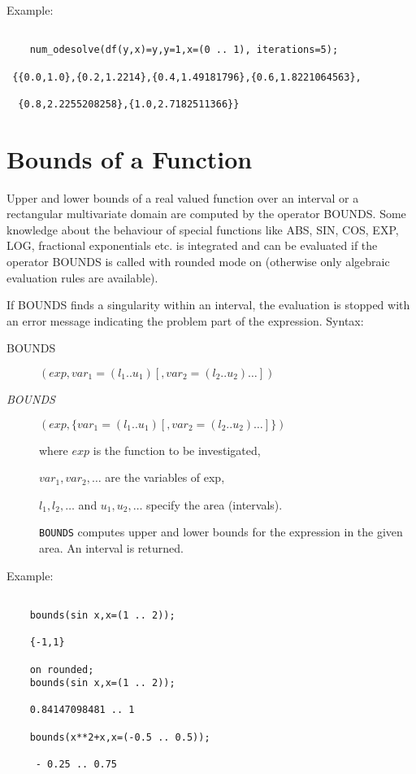 \documentclass[11pt,letterpaper]{book}
\makeatletter
\newcommand{\underscore}{\_}
\newcommand{\ttindex}[1]{{\renewcommand{\_}{\protect\underscore}%
                          \index{#1@{\tt #1}}}}
\makeatother
\begin{document}
Example:

{\small\begin{verbatim}

    num_odesolve(df(y,x)=y,y=1,x=(0 .. 1), iterations=5);

 {{0.0,1.0},{0.2,1.2214},{0.4,1.49181796},{0.6,1.8221064563},

  {0.8,2.2255208258},{1.0,2.7182511366}}

\end{verbatim}}


\section{Bounds of a Function}

Upper and lower bounds of a real valued function over an
interval or a rectangular multivariate domain are computed
by the operator \f{BOUNDS}.  Some knowledge
about the behaviour of special functions like ABS, SIN, COS, EXP, LOG,
fractional exponentials etc. is integrated and can be evaluated
if the operator BOUNDS is called with rounded mode on
(otherwise only algebraic evaluation rules are available).

If BOUNDS finds a singularity within an interval, the evaluation
is stopped with an error message indicating the problem part
of the expression.
\newpage
Syntax:\ttindex{BOUNDS}

\begin{description}
\item[BOUNDS]$(exp,var_1=(l_1 .. u_1) [,var_2=(l_2 .. u_2) \ldots])$

\item[{\it BOUNDS}]$(exp,\{var_1=(l_1 .. u_1) [,var_2=(l_2 .. u_2)\ldots]\})$

where $exp$ is the function to be investigated,

$var_1, var_2 , \ldots$ are the variables of exp,

$l_1, l_2 , \ldots$  and  $u_1, u_2 , \ldots$ specify the area (intervals).

{\tt BOUNDS} computes upper and lower bounds for the expression in the
given area. An interval is returned.

\end{description}

Example:

{\small\begin{verbatim}

    bounds(sin x,x=(1 .. 2));

    {-1,1}

    on rounded;
    bounds(sin x,x=(1 .. 2));

    0.84147098481 .. 1

    bounds(x**2+x,x=(-0.5 .. 0.5));

     - 0.25 .. 0.75

\end{verbatim}}
\end{document}
